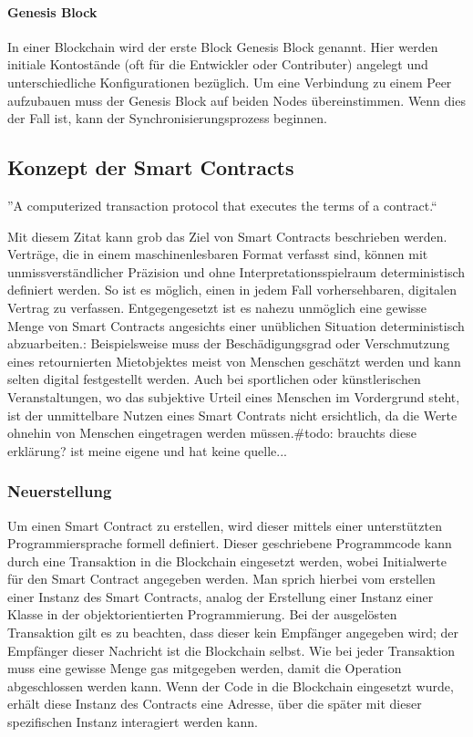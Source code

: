 \paragraph{Genesis Block}
In einer Blockchain wird der erste Block Genesis Block genannt. Hier werden initiale Kontostände (oft für die Entwickler oder Contributer) angelegt und unterschiedliche Konfigurationen bezüglich.
Um eine Verbindung zu einem Peer aufzubauen muss der Genesis Block auf beiden Nodes übereinstimmen. Wenn dies der Fall ist, kann der Synchronisierungsprozess beginnen.

\subsection{Konzept der Smart Contracts}
\label{subsec:Smart_Contracts}
''A computerized transaction protocol that executes the terms of a contract.``\cite{BlockchainRevolution}

Mit diesem Zitat kann grob das Ziel von Smart Contracts beschrieben werden. Verträge, die in einem maschinenlesbaren Format verfasst sind, können mit unmissverständlicher Präzision und ohne Interpretationsspielraum deterministisch definiert werden. So ist es möglich, einen in jedem Fall vorhersehbaren, digitalen Vertrag zu verfassen. Entgegengesetzt ist es nahezu unmöglich eine gewisse Menge von Smart Contracts angesichts einer unüblichen Situation deterministisch abzuarbeiten.\cite{ibtimes.co.uk/abiguity}: Beispielsweise muss der Beschädigungsgrad oder Verschmutzung eines retournierten Mietobjektes meist von Menschen geschätzt werden und kann selten digital festgestellt werden. Auch bei sportlichen oder künstlerischen Veranstaltungen, wo das subjektive Urteil eines Menschen im Vordergrund steht, ist der unmittelbare Nutzen eines Smart Contrats nicht ersichtlich, da die Werte ohnehin von Menschen eingetragen werden müssen.\#todo: brauchts diese erklärung? ist meine eigene und hat keine quelle...

\subsubsection{Neuerstellung}
\label{subsubsec:Neuerstellung}
Um einen Smart Contract zu erstellen, wird dieser mittels einer unterstützten Programmiersprache formell definiert. Dieser geschriebene Programmcode kann durch eine Transaktion in die Blockchain eingesetzt werden, wobei Initialwerte für den Smart Contract angegeben werden. Man sprich hierbei vom erstellen einer Instanz des Smart Contracts, analog der Erstellung einer Instanz einer Klasse in der objektorientierten Programmierung. Bei der ausgelösten Transaktion gilt es zu beachten, dass dieser kein Empfänger angegeben wird; der Empfänger dieser Nachricht ist die Blockchain selbst. Wie bei jeder Transaktion muss eine gewisse Menge gas mitgegeben werden, damit die Operation abgeschlossen werden kann.\cite[Solidity in Depth/Contracts/Creating Contracts]{solidity.readthedocs.io} Wenn der Code in die Blockchain eingesetzt wurde, erhält diese Instanz des Contracts eine Adresse, über die später mit dieser spezifischen Instanz interagiert werden kann.

